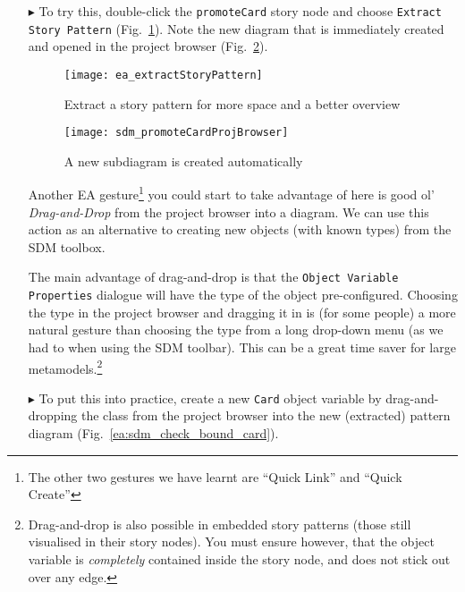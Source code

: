 \begin{itemize}

\item[$\blacktriangleright$] To try this, double-click the \texttt{promoteCard} story node and choose \texttt{Ext\-ract Story Pattern}
(Fig.~\ref{ea:sdm_check_extract_storypattern}). Note the new diagram that is immediately created and opened in the project browser
(Fig.~\ref{ea:sdm_new_sub_diagram}).

\begin{figure}[htbp]
\begin{center}
  \texttt{[image: ea\_extractStoryPattern]}
  \caption{Extract a story pattern for more space and a better overview}
  \label{ea:sdm_check_extract_storypattern}
\end{center}
\end{figure}

\begin{figure}[htbp]
\begin{center}
  \texttt{[image: sdm\_promoteCardProjBrowser]}
  \caption{A new subdiagram is created automatically}
  \label{ea:sdm_new_sub_diagram}
\end{center}
\end{figure}

\newpage

Another EA gesture\footnote{The other two gestures we have learnt are ``Quick Link'' and ``Quick Create''} you could start to take advantage of here is good
ol' \emph{Drag-and-Drop} from the project browser into a diagram. We can use this action as an alternative to creating new objects (with known types) from
the SDM toolbox.

The main advantage of drag-and-drop is that the \texttt{Object Variable Pro\-per\-ties} dialogue will have the type of the object pre-configured. Choosing
the type in the project browser and dragging it in is (for some people) a more natural gesture than choosing the type from a long drop-down menu (as we had to
when using the SDM toolbar). This can be a great time saver for large metamodels.\footnote{Drag-and-drop is also possible in embedded story patterns
(those still visualised in their story nodes).  You must ensure however, that the object variable is \emph{completely} contained inside the story node, and does
not stick out over any edge.}

\vspace{0.5cm}

\item[$\blacktriangleright$] To put this into practice, create a new \texttt{Card} object variable by drag-and-dropping the class from the project browser
into the new (extracted) pattern diagram (Fig.~\ref{ea:sdm_check_bound_card}).


\end{itemize}
